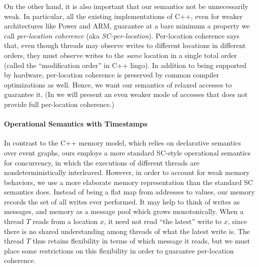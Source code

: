 On the other hand,
it is also important that our semantics not be
unnecessarily weak.  In particular, all the existing 
implementations of C++, even for weaker architectures like Power and
ARM, guarantee at a bare minimum a property we call \emph{per-location
  coherence} (aka \emph{SC-per-location}).  Per-location coherence
says that, even though threads may observe writes to different
locations in different orders, they must observe writes to the
\emph{same} location in a single total order (called the
``modification order'' in C++ lingo).
 In addition to being supported by hardware,
per-location coherence is preserved by common compiler optimizations
as well.  Hence, we want our semantics of relaxed accesses to
guarantee it. (In  we will present an even weaker mode of accesses that
does not provide full per-location coherence.)



\paragraph{Operational Semantics with Timestamps}

In contrast to the C++ memory model, which relies on declarative
semantics over event graphs, ours employs a more standard SC-style
operational semantics for concurrency, in which the executions of
different threads are nondeterministically interleaved.  However, in
order to account for weak memory behaviors, we use a more elaborate
memory representation than the standard SC semantics does.  Instead of
being a flat map from addresses to values, our memory records the set
of all writes ever performed.  It may help to think of writes as
messages, and memory as a message pool which grows monotonically.  When
a thread $T$ reads from a location $x$, it need not read ``the
latest'' write to $x$, since there is no shared understanding among
threads of what the latest write is.  The thread $T$ thus retains
flexibility in terms of which message it reads, but we must place some
restrictions on this flexibility in order to guarantee per-location
coherence.

